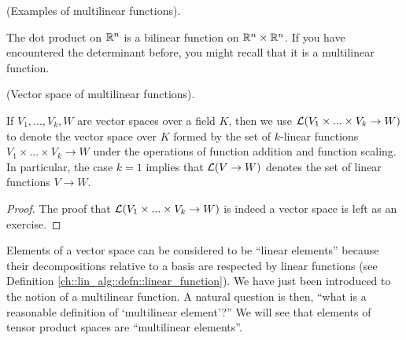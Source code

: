 \begin{example}
    (Examples of multilinear functions). 
    
    The dot product on $\mathbb{R}^n$ is a bilinear function on $\mathbb{R}^n \times \mathbb{R}^n$. If you have encountered the determinant before, you might recall that it is a multilinear function.
\end{example}

\begin{defn}
    (Vector space of multilinear functions).
    
    If $V_1, ..., V_k, W$ are vector spaces over a field $K$, then we use $\mathcal{L}(V_1 \times ... \times V_k \rightarrow W)$ to denote the vector space over $K$ formed by the set of $k$-linear functions $V_1 \times ... \times V_k \rightarrow W$ under the operations of function addition and function scaling. In particular, the case $k = 1$ implies that $\mathcal{L}(V \rightarrow W)$ denotes the set of linear functions $V \rightarrow W$.
\end{defn}

\begin{proof}
     The proof that $\mathcal{L}(V_1 \times ... \times V_k \rightarrow W)$ is indeed a vector space is left as an exercise.
\end{proof}

Elements of a vector space can be considered to be ``linear elements'' because their decompositions relative to a basis are respected by linear functions (see Definition \ref{ch::lin_alg::defn::linear_function}). We have just been introduced to the notion of a multilinear function. A natural question is then, ``what is a reasonable definition of `multilinear element'?'' We will see that elements of tensor product spaces are  ``multilinear elements''.

\newpage


